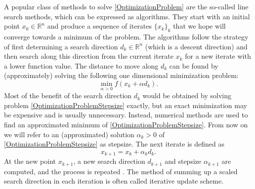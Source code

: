 A popular class of methods to solve \cref{OptimizationProblem} are the so-called line search methods, which can be expressed as algorithms. They start with an initial point $x_0 \in \mathbb{R}^n$ and produce a sequence of iterates $\{x_k\}_k$ that we hope will converge towards a minimum of the problem. The algorithms follow the strategy of first determining a search direction $d_k \in \mathbb{R}^n$ (which is a descent direction) and then search along this direction from the current iterate $x_k$ for a new iterate with a lower function value. The distance to move along $d_k$ can be found by (approximately) solving the following one dimensional minimization problem:
\begin{equation}\label{OptimizationProblemStepsize}
    \min_{\alpha > 0} f(x_k + \alpha d_k).
\end{equation}
Most of the benefit of the search direction $d_k$ would be obtained by solving problem \cref{OptimizationProblemStepsize} exactly, but an exact minimization may be expensive and is usually unnecessary. Instead, numerical methods are used to find an approximated minimum of \cref{OptimizationProblemStepsize}. From now on we will refer to an (approximated) solution $\alpha_k > 0$ of \cref{OptimizationProblemStepsize} as stepsize. The next iterate is defined as 
\begin{equation}\label{IterativeUpdateScheme}
    x_{k+1} = x_k + \alpha_k d_k.
\end{equation}
At the new point $x_{k+1}$, a new search direction $d_{k+1}$ and stepsize $\alpha_{k+1}$ are computed, and the process is repeated \cite[p.~19]{NocedalWright:2006}. The method of summing up a scaled search direction in each iteration is often called iterative update scheme. \\

